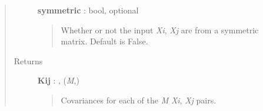 \documentclass[letterpaper,10pt,english]{sphinxmanual}
\begin{document}
\begin{fulllineitems}
\begin{fulllineitems}
\begin{quote}
\begin{description}
\textbf{symmetric} : bool, optional
\begin{quote}

Whether or not the input \emph{Xi}, \emph{Xj} are from a symmetric matrix.
Default is False.
\end{quote}

\item[{Returns}] \leavevmode
\textbf{Kij} : , (\emph{M},)
\begin{quote}

Covariances for each of the \emph{M} \emph{Xi}, \emph{Xj} pairs.
\end{quote}

\end{description}\end{quote}

\end{fulllineitems}


\end{fulllineitems}

\end{document}
